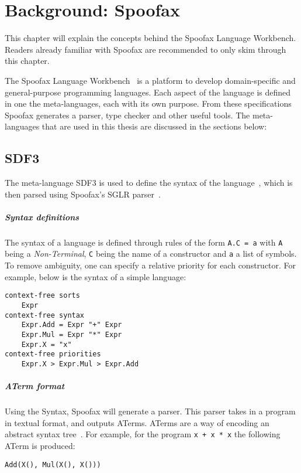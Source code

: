 \chapter{\label{chap:bg-spoofax}Background: Spoofax}

This chapter will explain the concepts behind the Spoofax Language Workbench. Readers already familiar with Spoofax are recommended to only skim through this chapter.

The Spoofax Language Workbench~\cite{spoofax} is a platform to develop domain-specific and
general-purpose programming languages. Each aspect of the language is defined in one the meta-languages, each with its own purpose. From these specifications Spoofax generates a parser, type checker and other useful tools. The meta-languages that are used in this thesis are discussed in the sections below:

\section{SDF3}

The meta-language SDF3 is used to define the syntax of the language~\cite{sdf3}, which is then parsed using Spoofax's SGLR parser~\cite{sdf3_parser}.

\paragraph{Syntax definitions}
The syntax of a language is defined through rules of the form \verb|A.C = a| with \verb|A| being a \emph{Non-Terminal}, \verb|C| being the name of a constructor and \verb|a| a list of symbols. To remove ambiguity, one can specify a relative priority for each constructor. For example, below is the syntax of a simple language:

\lstset{language=SDF3}
\begin{lstlisting}
context-free sorts
	Expr
context-free syntax
	Expr.Add = Expr "+" Expr
	Expr.Mul = Expr "*" Expr
	Expr.X = "x"
context-free priorities
	Expr.X > Expr.Mul > Expr.Add
\end{lstlisting}
\lstset{language=base}

\paragraph{ATerm format}
Using the Syntax, Spoofax will generate a parser. This parser takes in a program in textual format, and outputs ATerms. ATerms are a way of encoding an abstract syntax tree~\cite{aterm}. For example, for the program \verb|x + x * x| the following ATerm is produced:
\begin{lstlisting}
Add(X(), Mul(X(), X()))
\end{lstlisting}

